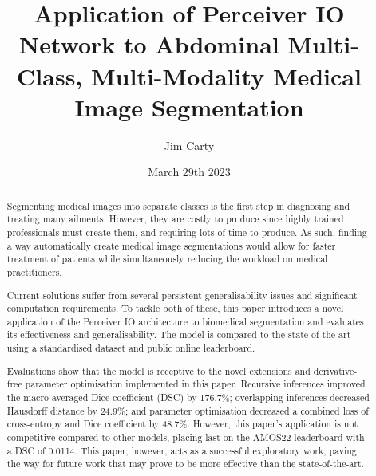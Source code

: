 \documentclass{l4proj}
\begin{document}
\title{Application of Perceiver IO Network to Abdominal Multi-Class, Multi-Modality Medical Image Segmentation}
\author{Jim Carty}
\date{March 29th 2023}

\maketitle

\begin{abstract}

Segmenting medical images into separate classes is the first step in diagnosing and treating many ailments. However, they are costly to produce since highly trained professionals must create them, and requiring lots of time to produce. As such, finding a way automatically create medical image segmentations would allow for faster treatment of patients while simultaneously reducing the workload on medical practitioners.

Current solutions suffer from several persistent generalisability issues and significant computation requirements. To tackle both of these, this paper introduces a novel application of the Perceiver IO architecture to biomedical segmentation and evaluates its effectiveness and generalisability. The model is compared to the state-of-the-art using a standardised dataset and public online leaderboard.

Evaluations show that the model is receptive to the novel extensions and derivative-free parameter optimisation implemented in this paper. Recursive inferences improved the macro-averaged Dice coefficient (DSC) by 176.7\%; overlapping inferences decreased Hausdorff distance by 24.9\%; and parameter optimisation decreased a combined loss of cross-entropy and Dice coefficient by 48.7\%. However, this paper's application is not competitive compared to other models, placing last on the AMOS22 leaderboard with a DSC of \num{0.0114}. This paper, however, acts as a successful exploratory work, paving the way for future work that may prove to be more effective than the state-of-the-art.

\end{abstract}
\end{document}
